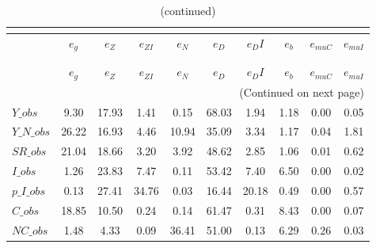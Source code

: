  
\begin{center}
\begin{longtable}{lccccccccc} 
\caption{VARIANCE DECOMPOSITION (in percent)}\\
 \label{Table:th_var_decomp_uncond}\\
\toprule 
$               $	 & 	 $        {e_g}$	 & 	 $        {e_Z}$	 & 	 $     {e_{ZI}}$	 & 	 $        {e_N}$	 & 	 $        {e_D}$	 & 	 $       {e_DI}$	 & 	 $        {e_b}$	 & 	 $    {e_{muC}}$	 & 	 $    {e_{muI}}$\\
\midrule \endfirsthead 
\caption{(continued)}\\
 \toprule \\ 
$               $	 & 	 $        {e_g}$	 & 	 $        {e_Z}$	 & 	 $     {e_{ZI}}$	 & 	 $        {e_N}$	 & 	 $        {e_D}$	 & 	 $       {e_DI}$	 & 	 $        {e_b}$	 & 	 $    {e_{muC}}$	 & 	 $    {e_{muI}}$\\
\midrule \endhead 
\midrule \multicolumn{10}{r}{(Continued on next page)} \\ \bottomrule \endfoot 
\bottomrule \endlastfoot 
$Y\_obs         $	 & 	         9.30	 & 	        17.93	 & 	         1.41	 & 	         0.15	 & 	        68.03	 & 	         1.94	 & 	         1.18	 & 	         0.00	 & 	         0.05 \\ 
$Y\_N\_obs      $	 & 	        26.22	 & 	        16.93	 & 	         4.46	 & 	        10.94	 & 	        35.09	 & 	         3.34	 & 	         1.17	 & 	         0.04	 & 	         1.81 \\ 
$SR\_obs        $	 & 	        21.04	 & 	        18.66	 & 	         3.20	 & 	         3.92	 & 	        48.62	 & 	         2.85	 & 	         1.06	 & 	         0.01	 & 	         0.62 \\ 
$I\_obs         $	 & 	         1.26	 & 	        23.83	 & 	         7.47	 & 	         0.11	 & 	        53.42	 & 	         7.40	 & 	         6.50	 & 	         0.00	 & 	         0.02 \\ 
$p\_I\_obs      $	 & 	         0.13	 & 	        27.41	 & 	        34.76	 & 	         0.03	 & 	        16.44	 & 	        20.18	 & 	         0.49	 & 	         0.00	 & 	         0.57 \\ 
$C\_obs         $	 & 	        18.85	 & 	        10.50	 & 	         0.24	 & 	         0.14	 & 	        61.47	 & 	         0.31	 & 	         8.43	 & 	         0.00	 & 	         0.07 \\ 
$NC\_obs        $	 & 	         1.48	 & 	         4.33	 & 	         0.09	 & 	        36.41	 & 	        51.00	 & 	         0.13	 & 	         6.29	 & 	         0.26	 & 	         0.03 \\ 

\end{longtable}
\end{center}
